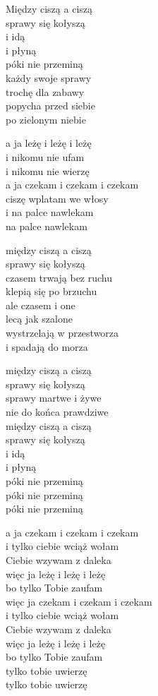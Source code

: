 \begin{text}
    Między ciszą a ciszą\\
    sprawy się kołyszą\\
    i idą\\
    i płyną\\
    póki nie przeminą\\
    \vin każdy swoje sprawy\\
    \vin trochę dla zabawy\\
    \vin popycha przed siebie\\
    \vin po zielonym niebie

    a ja leżę i leżę i leżę\\
    i nikomu nie ufam\\
    i nikomu nie wierzę\\
    a ja czekam i czekam i czekam\\
    ciszę wplatam we włosy\\
    i na palce nawlekam\\
    na palce nawlekam

    między ciszą a ciszą\\
    sprawy się kołyszą\\
    czasem trwają bez ruchu\\
    klepią się po brzuchu\\
    \vin ale czasem i one\\
    \vin lecą jak szalone\\
    \vin wystrzelają w przestworza\\
    \vin i spadają do morza

    między ciszą a ciszą\\
    sprawy się kołyszą\\
    sprawy martwe i żywe\\
    nie do końca prawdziwe\\
    między ciszą a ciszą\\
    sprawy się kołyszą\\
    i idą\\
    i płyną\\
    póki nie przeminą\\
    póki nie przeminą\\
    póki nie przeminą

    a ja czekam i czekam i czekam\\
    i tylko ciebie wciąż wołam\\
    Ciebie wzywam z daleka\\
    więc ja leżę i leżę i leżę\\
    bo tylko Tobie zaufam\\
    więc ja czekam i czekam i czekam\\
    i tylko ciebie wciąż wołam\\
    Ciebie wzywam z daleka\\
    więc ja leżę i leżę i leżę\\
    bo tylko Tobie zaufam\\
    tylko tobie uwierzę\\
    tylko tobie uwierzę
\end{text}
\begin{chord}

\end{chord}